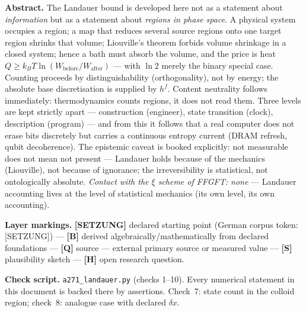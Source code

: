 
\providecommand{\qedsq}{\raisebox{0.03em}{\framebox[0.62em]{\rule{0pt}{0.42em}}}}
\begingroup\small\noindent
\textbf{Abstract.} The Landauer bound is developed here not as a statement about
\emph{information} but as a statement about \emph{regions in phase space}. A
physical system occupies a region; a map that reduces several source regions onto
one target region shrinks that volume; Liouville's theorem forbids volume
shrinkage in a closed system; hence a bath must absorb the volume, and the price
is heat $Q \ge k_B T \ln(W_{\text{before}}/W_{\text{after}})$ --- with $\ln 2$
merely the binary special case. Counting proceeds by distinguishability
(orthogonality), not by energy; the absolute base discretisation is supplied by
$h^f$. Content neutrality follows immediately: thermodynamics counts regions, it
does not read them. Three levels are kept strictly apart --- construction
(engineer), state transition (clock), description (program) --- and from this it
follows that a real computer does not erase bits discretely but carries a
continuous entropy current (DRAM refresh, qubit decoherence). The epistemic caveat
is booked explicitly: not measurable does not mean not present --- Landauer holds
because of the mechanics (Liouville), not because of ignorance; the
irreversibility is statistical, not ontologically absolute. \emph{Contact with the
$\xi$ scheme of FFGFT: none} --- Landauer accounting lives at the level of
statistical mechanics (its own level, its own accounting).
\par\endgroup

\bigskip

\begingroup\small\noindent
\textbf{Layer markings.} \textbf{[SETZUNG]} declared starting point (German corpus token:
[SETZUNG]) --- \textbf{[B]} derived algebraically/mathematically from declared foundations
--- \textbf{[Q]} source --- external primary source or measured value --- \textbf{[S]}
plausibility sketch --- \textbf{[H]} open research question.

\par\endgroup

\bigskip

\begingroup\small\noindent
\textbf{Check script.} \texttt{a271\_landauer.py} (checks 1--10). Every
numerical statement in this document is backed there by assertions. Check~7: state
count in the colloid region; check~8: analogue case with declared $\delta x$.
\par\endgroup

